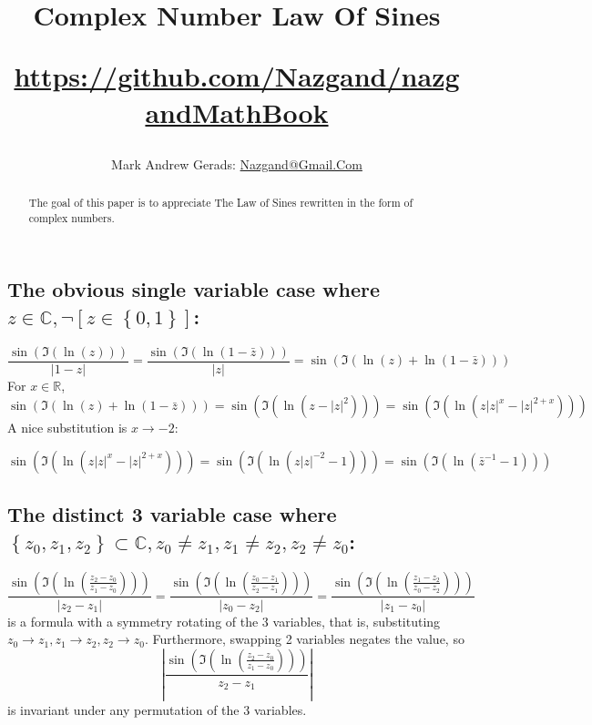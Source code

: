 \documentclass[]{article}
\author{Mark Andrew Gerads: \href{MailTo:Nazgand@Gmail.Com}{Nazgand@Gmail.Com}}
\title{
	Complex Number Law Of Sines
	
	\href{https://github.com/Nazgand/nazgandMathBook}{https://github.com/Nazgand/nazgandMathBook}
}
\newcommand{\pqty}[1]{{\left(#1\right)}}
\newcommand{\Bqty}[1]{{\left\{#1\right\}}}
\newcommand{\bqty}[1]{{\left[#1\right]}}
\newcommand{\abs}[1]{{\left\lvert#1\right\rvert}}
\numberwithin{equation}{section}
\begin{document}
	
	\maketitle
	
	\begin{abstract}
		The goal of this paper is to appreciate The Law of Sines rewritten in the form of complex numbers.
	\end{abstract}
	
	\subsection{The obvious single variable case where $z\in\mathbb{C},\lnot\bqty{z\in\Bqty{0,1}}$:}
	\begin{equation}
		\frac{\sin\pqty{\Im\pqty{\ln\pqty{z}}}}{\abs{1-z}}=
		\frac{\sin\pqty{\Im\pqty{\ln\pqty{1-\bar{z}}}}}{\abs{z}}=
		\sin\pqty{\Im\pqty{\ln\pqty{z}+\ln\pqty{1-\bar{z}}}}
	\end{equation}
	For $x\in\mathbb{R}$,
	\begin{equation}
		\sin\pqty{\Im\pqty{\ln\pqty{z}+\ln\pqty{1-\bar{z}}}}
		=\sin\pqty{\Im\pqty{\ln\pqty{z-\abs{z}^2}}}
		=\sin\pqty{\Im\pqty{\ln\pqty{z\abs{z}^x-\abs{z}^{2+x}}}}
	\end{equation}
	A nice substitution is $x\to -2$:
	
	\begin{equation}
		\sin\pqty{\Im\pqty{\ln\pqty{z\abs{z}^x-\abs{z}^{2+x}}}}
		=
		\sin\pqty{\Im\pqty{\ln\pqty{z\abs{z}^{-2}-1}}}
		=
		\sin\pqty{\Im\pqty{\ln\pqty{\bar{z}^{-1}-1}}}
	\end{equation}

	\subsection{The distinct 3 variable case where $\Bqty{z_0,z_1,z_2}\subset\mathbb{C},z_0\neq z_1,z_1\neq z_2,z_2\neq z_0$:}
	\begin{equation}
		\frac{\sin\pqty{\Im\pqty{\ln\pqty{\frac{z_2-z_0}{z_1-z_0}}}}}{\abs{z_2-z_1}}
		=\frac{\sin\pqty{\Im\pqty{\ln\pqty{\frac{z_0-z_1}{z_2-z_1}}}}}{\abs{z_0-z_2}}
		=\frac{\sin\pqty{\Im\pqty{\ln\pqty{\frac{z_1-z_2}{z_0-z_2}}}}}{\abs{z_1-z_0}}
	\end{equation}
	is a formula with a symmetry rotating of the 3 variables, that is, substituting
	$z_0\to z_1,z_1\to z_2,z_2\to z_0$. Furthermore, swapping 2 variables negates the value, so
	\begin{equation}
		\abs{\frac{\sin\pqty{\Im\pqty{\ln\pqty{\frac{z_2-z_0}{z_1-z_0}}}}}{z_2-z_1}}
	\end{equation}
	is invariant under any permutation of the 3 variables.
\end{document}
